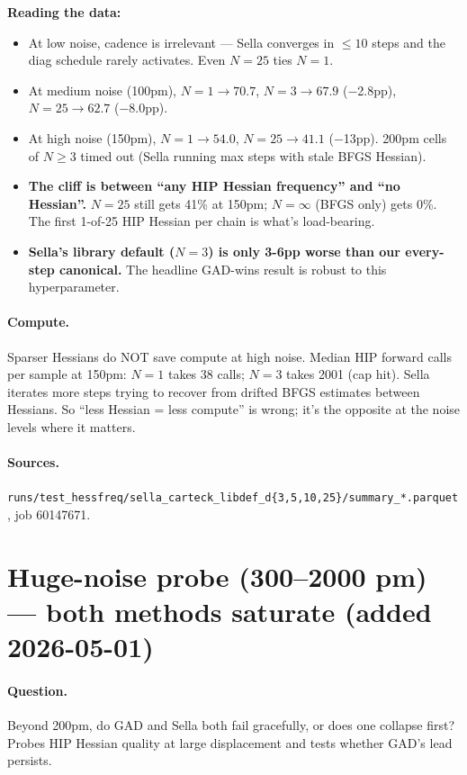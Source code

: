 \documentclass[11pt]{article}
\begin{document}
\textbf{Reading the data:}
\begin{itemize}[leftmargin=1.5em]
\item At low noise, cadence is irrelevant — Sella converges in $\le 10$ steps and the diag schedule rarely activates. Even $N{=}25$ ties $N{=}1$.
\item At medium noise (100pm), $N{=}1 \to 70.7$, $N{=}3 \to 67.9$ ($-$2.8pp), $N{=}25 \to 62.7$ ($-$8.0pp).
\item At high noise (150pm), $N{=}1 \to 54.0$, $N{=}25 \to 41.1$ ($-$13pp). 200pm cells of $N\ge 3$ timed out (Sella running max steps with stale BFGS Hessian).
\item \textbf{The cliff is between ``any HIP Hessian frequency'' and ``no Hessian''.} $N{=}25$ still gets 41\% at 150pm; $N=\infty$ (BFGS only) gets 0\%. The first 1-of-25 HIP Hessian per chain is what's load-bearing.
\item \textbf{Sella's library default ($N{=}3$) is only 3-6pp worse than our every-step canonical.} The headline GAD-wins result is robust to this hyperparameter.
\end{itemize}

\paragraph{Compute.} Sparser Hessians do NOT save compute at high noise.
Median HIP forward calls per sample at 150pm: $N{=}1$ takes 38 calls;
$N{=}3$ takes 2001 (cap hit). Sella iterates more steps trying to recover
from drifted BFGS estimates between Hessians. So ``less Hessian = less
compute'' is wrong; it's the opposite at the noise levels where it matters.

\paragraph{Sources.} \texttt{runs/test\_hessfreq/sella\_carteck\_libdef\_d\{3,5,10,25\}/summary\_*.parquet}, job 60147671.

\section{Huge-noise probe (300--2000 pm) — both methods saturate (added 2026-05-01)}

\paragraph{Question.} Beyond 200pm, do GAD and Sella both fail
gracefully, or does one collapse first? Probes HIP Hessian quality
at large displacement and tests whether GAD's lead persists.
\end{document}
